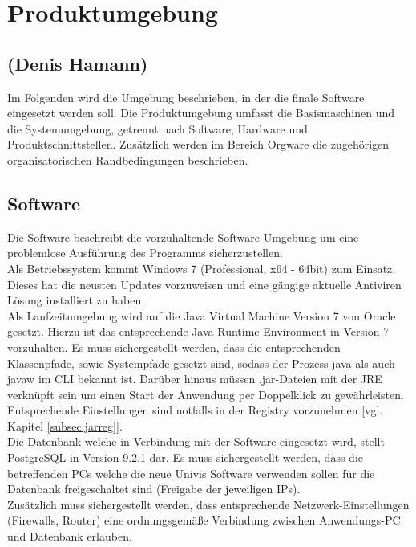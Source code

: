 \section{Produktumgebung}
\label{sec:Produktumgebung}

\subsection*{(Denis Hamann)}

Im Folgenden wird die Umgebung beschrieben, in der die finale Software eingesetzt werden soll.
Die Produktumgebung umfasst die Basismaschinen und die Systemumgebung, getrennt nach Software, Hardware und
Produktschnittstellen. Zusätzlich werden im Bereich Orgware die zugehörigen organisatorischen Randbedingungen beschrieben.

\subsection{Software}
\label{subsec:software}

Die Software beschreibt die vorzuhaltende Software-Umgebung um eine problemlose Ausführung des Programms sicherzustellen.\\


Als Betriebssystem kommt Windows 7 (Professional, x64 - 64bit) zum Einsatz. Dieses hat die neusten Updates vorzuweisen und eine gängige aktuelle Antiviren Lösung installiert zu haben.\\

Als Laufzeitumgebung wird auf die Java Virtual Machine Version 7 von Oracle gesetzt.
Hierzu ist das entsprechende Java Runtime Environment in Version 7 vorzuhalten. Es muss sichergestellt werden, dass die entsprechenden Klassenpfade, sowie Systempfade gesetzt sind, sodass der Prozess java als auch javaw im CLI bekannt ist. Darüber hinaus müssen .jar-Dateien mit der JRE verknüpft sein um einen Start der Anwendung per Doppelklick zu gewährleisten. Entsprechende Einstellungen sind notfalls in der Registry vorzunehmen [vgl. Kapitel \ref{subsec:jarreg}].\\

Die Datenbank welche in Verbindung mit der Software eingesetzt wird, stellt PostgreSQL in Version 9.2.1 dar.
Es muss sichergestellt werden, dass die betreffenden PCs welche die neue Univis Software verwenden sollen für die Datenbank freigeschaltet sind (Freigabe der jeweiligen IPs).\\

Zusätzlich muss sichergestellt werden, dass entsprechende Netzwerk-Einstellungen (Firewalls, Router) eine ordnungsgemäße Verbindung zwischen Anwendungs-PC und Datenbank erlauben.\\

